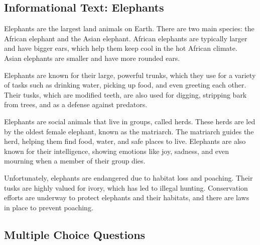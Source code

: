 \documentclass[12pt]{article}
\begin{document}
\onehalfspacing

\subsection*{Informational Text: Elephants}

\begin{tcolorbox}[colframe=black!40, colback=gray!5]

\begin{spacing}{1.15}

Elephants are the largest land animals on Earth. There are two main species: the African elephant and the Asian elephant. African elephants are typically larger and have bigger ears, which help them keep cool in the hot African climate. Asian elephants are smaller and have more rounded ears. 

Elephants are known for their large, powerful trunks, which they use for a variety of tasks such as drinking water, picking up food, and even greeting each other. Their tusks, which are modified teeth, are also used for digging, stripping bark from trees, and as a defense against predators.

Elephants are social animals that live in groups, called herds. These herds are led by the oldest female elephant, known as the matriarch. The matriarch guides the herd, helping them find food, water, and safe places to live. Elephants are also known for their intelligence, showing emotions like joy, sadness, and even mourning when a member of their group dies.

Unfortunately, elephants are endangered due to habitat loss and poaching. Their tusks are highly valued for ivory, which has led to illegal hunting. Conservation efforts are underway to protect elephants and their habitats, and there are laws in place to prevent poaching.

\end{spacing}

\end{tcolorbox}
 \vspace{1.2cm}
\subsection*{Multiple Choice Questions}
\end{document}
